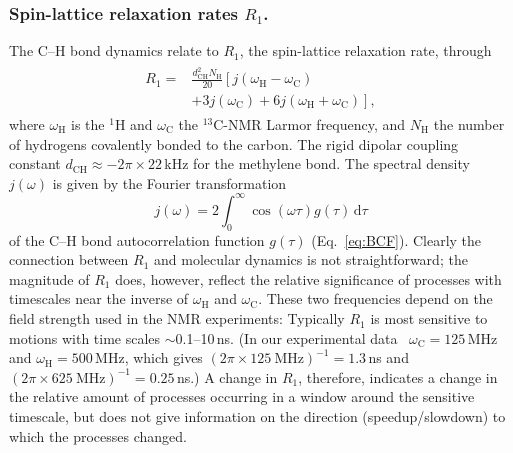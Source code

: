 \documentclass[journal=jcisd8,manuscript=article,layout=twocolumn]{achemso}
\begin{document}
\subsubsection*{Spin-lattice relaxation rates $R_1$.}
The \mbox{C--H} bond dynamics relate to $R_1$, the spin-lattice relaxation rate, through
\begin{align}
\label{eq:R1}
\begin{split}
R_{1}=&\frac{d^2_{\mathrm{CH}}N_{\mathrm{H}}}{20}\left[j(\omega_{\mathrm{H}}-\omega_{\mathrm{C}})\right. \\
&\left.+3j(\omega_{\mathrm{C}})+6j(\omega_{\mathrm{H}}+\omega_{\mathrm{C}})\right],
\end{split}
\end{align}
where $\omega_{\mathrm{H}}$ is the $^1$H and $\omega_{\mathrm{C}}$ the $^{13}$C-NMR Larmor frequency, and $N_{\mathrm{H}}$ the number of hydrogens covalently bonded to the carbon.
The rigid dipolar coupling constant $d_{\mathrm{CH}}\approx-2\pi\times22$\,kHz for the methylene bond.
The spectral density $j(\omega)$ is given by the Fourier transformation
\begin{equation}
j{(\omega)}=2\int_{0}^{\infty}\cos(\omega\tau)g(\tau)\,\mathrm d\tau
\end{equation}
of the C--H bond autocorrelation function $g(\tau)$ (Eq.~\eqref{eq:BCF}).
Clearly
the connection between $R_1$ and molecular dynamics is not straightforward;
the magnitude of $R_1$ does, however, reflect the relative significance of processes
with timescales near the inverse of $\omega_{\mathrm{H}}$ and $\omega_{\mathrm{C}}$. These two frequencies depend on the field strength used in the NMR experiments: Typically
$R_1$ is most sensitive to motions with time scales $\sim$0.1--10\,ns.
%
(In our experimental data~\cite{ferreira15,pham15,Volke:1995a,Antila:2020a}
$\omega_\mathrm C=125$\,MHz and $\omega_\mathrm H=500$\,MHz,
which gives
$(2\pi\times125~\mathrm{MHz})^{-1}=1.3$\,ns and
$(2\pi\times625~\mathrm{MHz})^{-1}=0.25$\,ns.)
%
A change in $R_{1}$, therefore, indicates a change in the relative amount of processes
occurring in a window around the sensitive timescale, but does not give information on the direction (speedup/slowdown) to which the processes changed.
\end{document}
